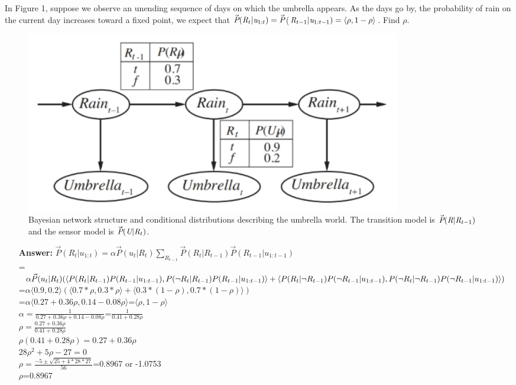 \documentclass{article}
\begin{document}
\section{}In Figure 1, suppose we observe an unending sequence of days on which the umbrella appears. As the days go by, the probability of rain on the current day increases toward a fixed point, we expect that $\vec{\textit P}(\textit R_{t}\vert \textit u_{1:t}) = \vec{\textit P}$($\textit R_{t-1}\vert\textit u_{1:t-1}) = \langle\rho, 1 - \rho\rangle$. Find $\rho$.
	\begin{figure}[h!]
	\centering
	\includegraphics[width=0.8\textwidth]{figure_1.png}
	\caption{Bayesian network structure and conditional distributions describing the umbrella world. The transition model is $\vec{\textit P}(\textit R\vert\textit R_{t-1})$ and the sensor model is $\vec{\textit P}(\textit U\vert\textit R_{t})$.}
	\end{figure}
	\begin{itemize}
	\item[\textbf{Answer:}]$\vec{P}(R_{t}\vert u_{1:t})=\alpha\vec{P}(u_{t}\vert R_{t})\sum_{R_{t-1}}\vec{P}(R_{t}\vert R_{t-1})\vec{P}(R_{t-1}\vert u_{1:t-1})$\\=$\alpha\vec{P}(u_{t}\vert R_{t})(\langle P(R_{t}\vert R_{t-1})P(R_{t-1}\vert u_{1:t-1}),P(\neg R_{t}\vert R_{t-1})P(R_{t-1}\vert u_{1:t-1})\rangle+\\\langle P(R_{t}\vert\neg R_{t-1})P(\neg R_{t-1}\vert u_{1:t-1}),P(\neg R_{t}\vert\neg R_{t-1})P(\neg R_{t-1}\vert u_{1:t-1})\rangle)$\\=$\alpha\langle0.9,0.2\rangle(\langle0.7*\rho,0.3*\rho\rangle+\langle0.3*(1-\rho),0.7*(1-\rho)\rangle)$\\=$\alpha\langle0.27+0.36\rho,0.14-0.08\rho\rangle$=$\langle\rho,1-\rho\rangle$\\$\alpha=\frac{1}{0.27+0.36\rho+0.14-0.08\rho}$=$\frac{1}{0.41+0.28\rho}$\\$\rho=\frac{0.27+0.36\rho}{0.41+0.28\rho}$\\$\rho(0.41+0.28\rho)=0.27+0.36\rho$\\$28\rho^2+5\rho-27=0$\\$\rho=\frac{-5\pm\sqrt{25+4*28*27}}{56}$=0.8967 or -1.0753\\$\rho$=0.8967
	\end{itemize}
\end{document}
